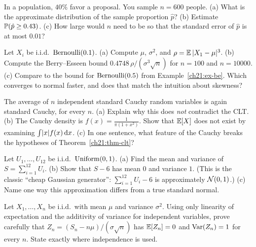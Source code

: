 \begin{exercise}[A poll]
\label{ch21:ex-poll2}
In a population, $40\%$ favor a proposal. You sample $n = 600$ people. (a) What is the
approximate distribution of the sample proportion $\hat p$? (b) Estimate
$\P(\hat p \ge 0.43)$. (c) How large would $n$ need to be so that the standard error of
$\hat p$ is at most $0.01$?
\end{exercise}

\begin{exercise}
\label{ch21:ex-be-hand}
Let $X_i$ be i.i.d.\ $\Bern(0.1)$. (a) Compute $\mu$, $\sigma^2$, and
$\rho = \E\,\abs{X_1 - \mu}^3$. (b) Compute the Berry--Esseen bound
$0.4748\,\rho/(\sigma^3\sqrt n)$ for $n = 100$ and $n = 10000$. (c) Compare to the bound
for $\Bern(0.5)$ from Example~\ref{ch21:ex-be}. Which converges to normal faster, and
does that match the intuition about skewness?
\end{exercise}

\begin{exercise}
\label{ch21:ex-cauchy}
The average of $n$ independent standard Cauchy random variables is again standard Cauchy,
for every $n$. (a) Explain why this does \emph{not} contradict the CLT. (b) The Cauchy
density is $f(x) = \frac{1}{\pi(1+x^2)}$. Show that $\E[X]$ does not exist by examining
$\int \abs{x} f(x)\,\dd x$. (c) In one sentence, what feature of the Cauchy breaks the
hypotheses of Theorem~\ref{ch21:thm-clt}?
\end{exercise}

\begin{exercise}
\label{ch21:ex-irwin}
Let $U_1, \dots, U_{12}$ be i.i.d.\ $\Unif(0,1)$. (a) Find the mean and variance of
$S = \sum_{i=1}^{12} U_i$. (b) Show that $S - 6$ has mean $0$ and variance $1$. (This is
the classic ``cheap Gaussian generator'': $\sum_{i=1}^{12} U_i - 6$ is approximately
$\Normal(0,1)$.) (c) Name one way this approximation differs from a true standard normal.
\end{exercise}

\begin{exercise}
\label{ch21:ex-proof-std}
Let $X_1, \dots, X_n$ be i.i.d.\ with mean $\mu$ and variance $\sigma^2$. Using only
linearity of expectation and the additivity of variance for independent variables, prove
carefully that $Z_n = (S_n - n\mu)/(\sigma\sqrt n)$ has $\E[Z_n] = 0$ and
$\Var(Z_n) = 1$ for every $n$. State exactly where independence is used.
\end{exercise}

